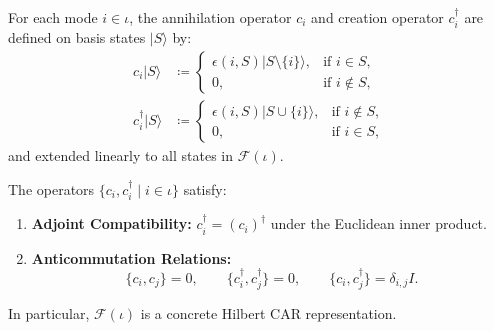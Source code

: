 \begin{definition}
For each mode $i \in \iota$, the annihilation operator $c_i$ and creation operator $c_i^\dagger$ are defined on basis states $|S\rangle$ by:
\begin{align}
c_i |S\rangle &\coloneqq \begin{cases}
\epsilon(i, S) |S \setminus \{i\}\rangle, & \text{if } i \in S, \\
0, & \text{if } i \notin S,
\end{cases} \label{eq:fock_c} \\
c_i^\dagger |S\rangle &\coloneqq \begin{cases}
\epsilon(i, S) |S \cup \{i\}\rangle, & \text{if } i \notin S, \\
0, & \text{if } i \in S,
\end{cases} \label{eq:fock_cdag}
\end{align}
and extended linearly to all states in $\mathcal{F}(\iota)$.
\end{definition}

\begin{theorem}
\label{thm:fock_car_verification}
The operators $\{c_i, c_i^\dagger \mid i \in \iota\}$ satisfy:
\begin{enumerate}
    \item \textbf{Adjoint Compatibility:} $c_i^\dagger = (c_i)^\dagger$ under the Euclidean inner product.
    \item \textbf{Anticommutation Relations:}
    \begin{equation}
    \{c_i, c_j\} = 0, \qquad \{c_i^\dagger, c_j^\dagger\} = 0, \qquad \{c_i, c_j^\dagger\} = \delta_{i, j} I.
    \end{equation}
\end{enumerate}
In particular, $\mathcal{F}(\iota)$ is a concrete Hilbert CAR representation.
\end{theorem}

